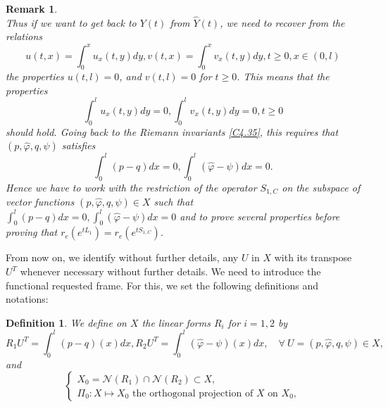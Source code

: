 \documentclass[10pt, english]{article}
\newtheorem{dfn}[thm]{Definition}
\newtheorem{oss}[thm]{Remark}
\begin{document}
{\begin{oss}
\begin{equation}
\end{equation}
Thus if we want to get back to  $Y(t)$ from $\widehat{Y}(t)$, we need to recover from the relations
$$
u(t,x)=\int_0^x u_x(t,y)dy, v(t,x)=\int_0^x v_x(t,y)dy, t \geqslant 0, x \in (0,l)
$$
the properties $u(t,l)=0$, and $v(t,l)=0$ for $t \geqslant 0$. This means that the properties
$$
\int_0^l u_x(t,y)dy=0,  \int_0^l v_x(t,y)dy=0, t \geqslant 0
$$
should hold. Going back to the Riemann invariants \eqref{C4.35}, this requires that $(p,\widehat{\varphi}, q , \psi)$ satisfies
$$
\int_0^l (p-q)dx=0, \int_0^l (\widehat{\varphi}-\psi)dx=0.
$$
Hence we have to work with the restriction of the operator $S_{1,C}$ on the subspace of vector functions $(p,\widehat{\varphi}, q , \psi) \in X$ such that $\int_0^l (p-q)dx=0, \int_0^l (\widehat{\varphi}-\psi)dx=0$ and to prove several properties before proving that $r_e(e^{tL_1})=r_e(e^{tS_{1,C}})$.
\end{oss}

From now on, we identify without further details, any $U$ in $X$ with its transpose $U^T$ whenever necessary without further details. We need to introduce the functional requested frame. For this, we set the following definitions and notations:
\begin{dfn}
We define on $X$ the linear forms $R_i$ for $i=1,2$ by
\begin{equation}\label{C4.37}%
R_1U^T=\int_0^l(p-q)(x)dx, R_2U^T=\int_0^l(\widehat{\varphi}-\psi)(x)dx, \quad \forall \ U=(p, \widehat{\varphi}, q, \psi) \in X,
\end{equation}
and
\begin{equation}\label{C4.38}%
\begin{cases}
X_0=\mathcal{N}(R_1) \cap \mathcal{N}(R_2) \subset X, \\
\Pi_0: X \mapsto X_0 \mbox{ the orthogonal projection of } X \mbox{ on } X_0,


\end{cases}
\end{equation}
\end{dfn}}
\end{document}
